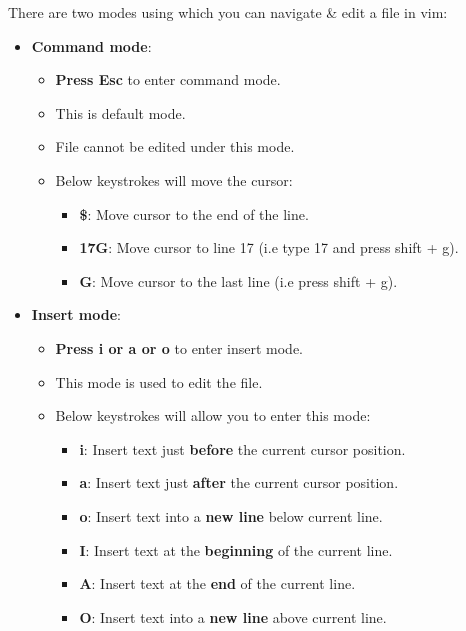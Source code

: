 
\begin{flushleft}
	
	There are two modes using which you can navigate \& edit a file in vim:
	\begin{itemize}

		\item \textbf{Command mode}: 
		\begin{itemize}
			\item \textbf{Press Esc} to enter command mode.
			\item This is default mode.
			\item File cannot be edited under this mode.
			\item Below keystrokes will move the cursor:
			\begin{itemize}	
				\item \textbf{\$}: Move cursor to the end of the line.
				\item \textbf{17G}: Move cursor to line 17 (i.e type 17 and press shift + g).
				\item \textbf{G}: Move cursor to the last line (i.e press shift + g).
			\end{itemize}
			
		\end{itemize}

		\newline
		\bigskip
		
		\bigskip
		\bigskip
		\item \textbf{Insert mode}: 
		\begin{itemize}
			\item \textbf{Press i or a or o} to enter insert mode.
			\item This mode is used to edit the file.
			\item Below keystrokes will allow you to enter this mode:
			\begin{itemize}
				\item \textbf{i}: Insert text just \textbf{before} the current cursor position.
				\item \textbf{a}: Insert text just \textbf{after} the current cursor position.
				\item \textbf{o}: Insert text into a \textbf{new line} below current line.
				\item \textbf{I}: Insert text at the \textbf{beginning} of the current line.
				\item \textbf{A}: Insert text at the \textbf{end} of the current line.
				\item \textbf{O}: Insert text into a \textbf{new line} above current line.
			\end{itemize}
			
		\end{itemize}

					
	
		
		

	\end{itemize}
	
	
\end{flushleft}

\newpage
